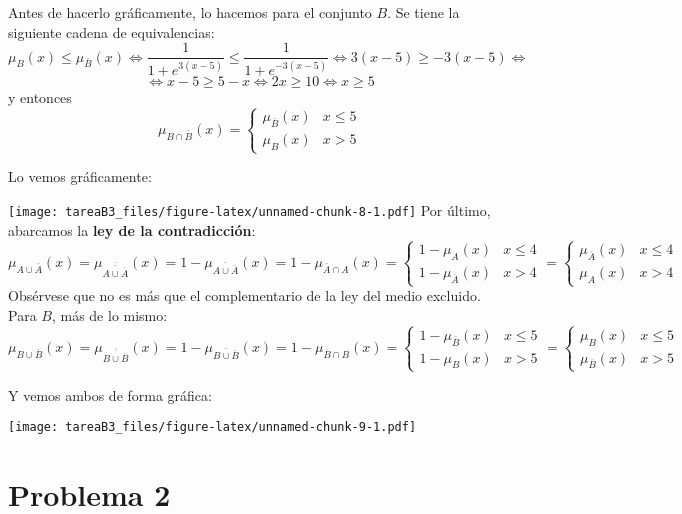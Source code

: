\documentclass[
]{article}
\begin{document}
Antes de hacerlo gráficamente, lo hacemos para el conjunto \(B\). Se
tiene la siguiente cadena de equivalencias:
\[\mu_{B}\left(x\right)\leq\mu_{\overline{B}}\left(x\right)\iff\frac{1}{1+e^{3\left(x-5\right)}}\leq\frac{1}{1+e^{-3\left(x-5\right)}}\iff3\left(x-5\right)\geq-3\left(x-5\right)\iff\]
\[\iff x-5\geq5-x\iff2x\geq10\iff x\geq5\] y entonces
\[\mu_{B\cap\overline{B}}\left(x\right)=\begin{cases}
\mu_{\overline{B}}\left(x\right) & x\leq5\\
\mu_{B}\left(x\right) & x>5
\end{cases}\]

Lo vemos gráficamente:

\texttt{[image: tareaB3\_files/figure-latex/unnamed-chunk-8-1.pdf]} Por
último, abarcamos la \textbf{ley de la contradicción}:
\[\mu_{A\cup\overline{A}}\left(x\right)=\mu_{\overline{\overline{A\cup\overline{A}}}}\left(x\right)=1-\mu_{\overline{A\cup\overline{A}}}\left(x\right)=1-\mu_{\overline{A}\cap A}\left(x\right)=\begin{cases}
1-\mu_{A}\left(x\right) & x\leq4\\
1-\mu_{\overline{A}}\left(x\right) & x>4
\end{cases}=\begin{cases}
\mu_{\overline{A}}\left(x\right) & x\leq4\\
\mu_{A}\left(x\right) & x>4
\end{cases}\] Obsérvese que no es más que el complementario de la ley
del medio excluido. Para \(B\), más de lo mismo:
\[\mu_{B\cup\overline{B}}\left(x\right)=\mu_{\overline{\overline{B\cup\overline{B}}}}\left(x\right)=1-\mu_{\overline{B\cup\overline{B}}}\left(x\right)=1-\mu_{\overline{B}\cap B}\left(x\right)=\begin{cases}
1-\mu_{\overline{B}}\left(x\right) & x\leq5\\
1-\mu_{B}\left(x\right) & x>5
\end{cases}=\begin{cases}
\mu_{B}\left(x\right) & x\leq5\\
\mu_{\overline{B}}\left(x\right) & x>5
\end{cases}\]

Y vemos ambos de forma gráfica:

\texttt{[image: tareaB3\_files/figure-latex/unnamed-chunk-9-1.pdf]}
\newpage

\hypertarget{problema-2}{%
\section{Problema 2}\label{problema-2}}
\end{document}
